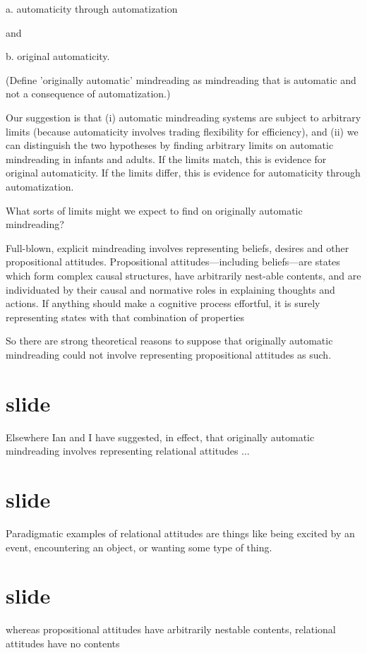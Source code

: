\documentclass[14pt,\papersize]{extarticle}
\begin{document}
a. automaticity through automatization
 
and 

b. original automaticity.

(Define 'originally automatic' mindreading as mindreading that is automatic and not a consequence of automatization.)

Our suggestion is that 
(i) automatic mindreading systems are subject to arbitrary limits (because automaticity involves trading flexibility for efficiency),
and 
(ii) we can distinguish the two hypotheses by finding arbitrary limits on automatic mindreading in infants and adults.
If the limits match, this is evidence for original automaticity.
If the limits differ, this is evidence for automaticity through automatization.

What sorts of limits might we expect to find on originally automatic mindreading?

Full-blown, explicit mindreading involves representing beliefs, desires and other propositional attitudes.
Propositional attitudes---including beliefs---are states which form complex causal structures, have arbitrarily nest-able contents, and are individuated by their causal and normative roles in explaining thoughts and actions.  
If anything should make a cognitive process effortful, it is surely representing states with that combination of properties

So there are strong theoretical reasons to suppose that originally automatic mindreading could not involve representing propositional attitudes as such.

\section{slide}
Elsewhere Ian and I have suggested, in effect, that originally automatic mindreading involves representing relational attitudes ...

\section{slide}
Paradigmatic examples of relational attitudes are things like 
being excited by an event,
encountering an object,
or wanting some type of thing.



\section{slide}
whereas propositional attitudes have arbitrarily nestable contents,
relational attitudes have no contents
\end{document}
